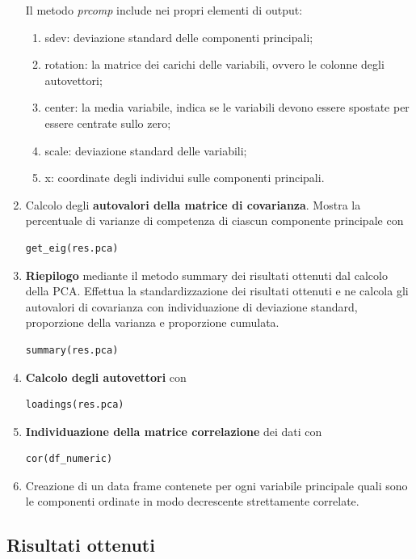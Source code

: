 \begin{enumerate}
Il metodo \textit{prcomp} include nei propri elementi di output:
 \begin{enumerate}
 \item sdev: deviazione standard delle componenti principali;
 \item rotation: la matrice dei carichi delle variabili, ovvero le colonne degli autovettori;
 \item center: la media variabile, indica se le variabili devono essere spostate per essere centrate sullo zero;
 \item scale: deviazione standard delle variabili;
 \item x: coordinate degli individui sulle componenti principali.
 \end{enumerate}
 \noindent
\item Calcolo degli \textbf{autovalori della matrice di covarianza}. Mostra la percentuale di varianze di competenza di ciascun componente principale con
\begin{verbatim}
get_eig(res.pca)
\end{verbatim}

\item \textbf{Riepilogo} mediante il metodo summary dei risultati ottenuti dal calcolo della PCA. Effettua la standardizzazione dei risultati ottenuti e ne calcola gli autovalori di covarianza con individuazione di deviazione standard, proporzione della varianza e proporzione cumulata.
\begin{verbatim}
summary(res.pca)
\end{verbatim}
\item \textbf{Calcolo degli autovettori} con
\begin{verbatim}
loadings(res.pca)
\end{verbatim}

\item \textbf{Individuazione della matrice correlazione} dei dati con
\begin{verbatim}
cor(df_numeric)
\end{verbatim}

\item Creazione di un data frame contenete per ogni variabile principale quali sono le componenti ordinate in modo decrescente strettamente correlate.
\end{enumerate}

\subsection{Risultati ottenuti}
\label{Risultati ottenuti}

